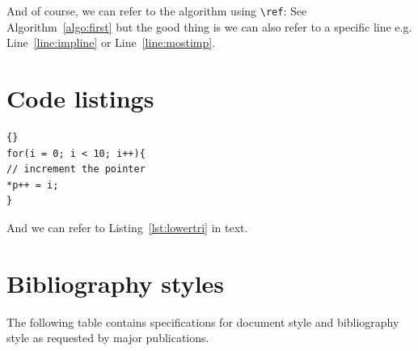 \documentclass[twocolumn]{article}
\begin{document}
And of course, we can refer to the algorithm using \verb|\ref|: See Algorithm~\ref{algo:first} but the good thing is we can also refer to a specific line e.g. Line~\ref{line:impline} or Line~\ref{line:mostimp}.


\section{Code listings}

\lstset{language=c++, float=H}
\lstset{caption=Some C++ Code}
\begin{lstlisting}[frame=single, label=lst:lowertri]{}
for(i = 0; i < 10; i++){
// increment the pointer
*p++ = i;
}
\end{lstlisting}



And we can refer to Listing~\ref{lst:lowertri} in text.



\section{Bibliography styles} 

The following table contains specifications for document style and bibliography style as requested by major publications.
\end{document}
